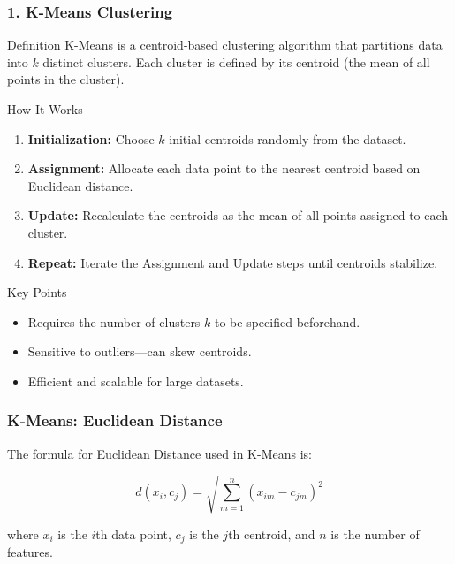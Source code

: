 \documentclass[aspectratio=169]{beamer}
\begin{document}
\begin{frame}[fragile]
    \frametitle{1. K-Means Clustering}
    \begin{block}{Definition}
        K-Means is a centroid-based clustering algorithm that partitions data into $k$ distinct clusters. Each cluster is defined by its centroid (the mean of all points in the cluster).
    \end{block}
    
    \begin{block}{How It Works}
        \begin{enumerate}
            \item \textbf{Initialization:} Choose $k$ initial centroids randomly from the dataset.
            \item \textbf{Assignment:} Allocate each data point to the nearest centroid based on Euclidean distance.
            \item \textbf{Update:} Recalculate the centroids as the mean of all points assigned to each cluster.
            \item \textbf{Repeat:} Iterate the Assignment and Update steps until centroids stabilize.
        \end{enumerate}
    \end{block}

    \begin{block}{Key Points}
        \begin{itemize}
            \item Requires the number of clusters $k$ to be specified beforehand.
            \item Sensitive to outliers—can skew centroids.
            \item Efficient and scalable for large datasets.
        \end{itemize}
    \end{block}
\end{frame}

\begin{frame}[fragile]
    \frametitle{K-Means: Euclidean Distance}
    The formula for Euclidean Distance used in K-Means is:

    \begin{equation}
        d(x_i, c_j) = \sqrt{\sum_{m=1}^{n} (x_{im} - c_{jm})^2}
    \end{equation}
    
    where \(x_i\) is the $i$th data point, \(c_j\) is the $j$th centroid, and \(n\) is the number of features.
\end{frame}
\end{document}
